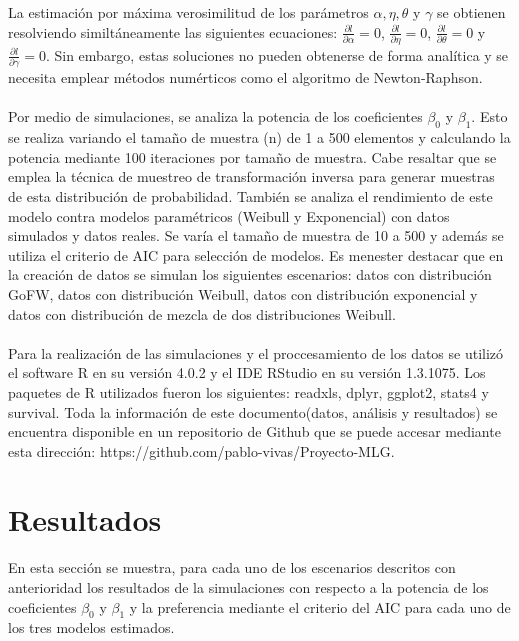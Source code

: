 \documentclass[12pt,a4paper]{article}
\begin{document}
La estimación por máxima verosimilitud de los parámetros $\alpha, \eta, \theta$ y $\gamma$ se obtienen resolviendo similtáneamente las siguientes ecuaciones: $\frac{\partial l}{\partial \alpha} =0$, $\frac{\partial l}{\partial \eta} =0$, $\frac{\partial l}{\partial \theta} =0$ y $\frac{\partial l}{\partial \gamma} =0$. Sin embargo, estas soluciones no pueden obtenerse de forma analítica y se necesita emplear métodos numérticos como el algoritmo de Newton-Raphson.\\
\\
Por medio de simulaciones, se analiza la potencia de los coeficientes $\beta_0$ y $\beta_1$. Esto se realiza variando el tamaño de muestra (n) de 1 a 500 elementos y calculando la potencia mediante 100 iteraciones por tamaño de muestra. Cabe resaltar que se emplea la técnica de muestreo de transformación inversa para generar muestras de esta distribución de probabilidad. También se analiza  el rendimiento de este modelo contra modelos paramétricos (Weibull y Exponencial) con datos simulados y datos reales. Se varía el tamaño de muestra de 10 a 500 y además se utiliza el criterio de AIC para selección de modelos. Es menester destacar que en la creación de datos se simulan los siguientes escenarios: datos con distribución GoFW, datos con distribución Weibull, datos con distribución exponencial y datos con distribución de mezcla de dos distribuciones Weibull.\\
\\
Para la realización  de las simulaciones y el proccesamiento de los datos se utilizó el software R en su versión 4.0.2 y el IDE RStudio en su versión 1.3.1075. Los paquetes de R utilizados fueron los siguientes: readxls, dplyr, ggplot2, stats4 y survival. Toda la información de este documento(datos, análisis y resultados) se encuentra disponible en un repositorio de Github que se puede accesar mediante esta dirección: https://github.com/pablo-vivas/Proyecto-MLG.
\newpage
\section{Resultados}
En esta sección se muestra, para cada uno de los escenarios descritos con anterioridad los resultados de
la simulaciones con respecto a la potencia de los coeficientes $\beta_0$ y $\beta_1$ y la preferencia mediante el criterio del AIC para cada uno de los tres modelos estimados. 
\end{document}
